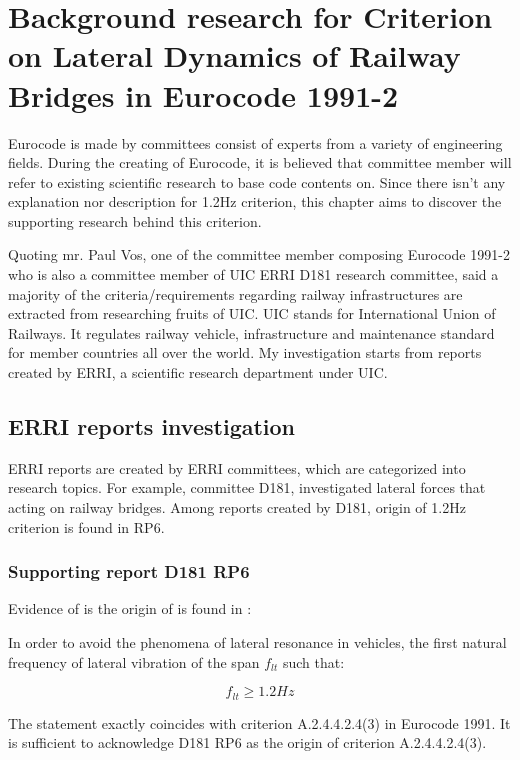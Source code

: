 
\chapter{Background research for Criterion on Lateral Dynamics of Railway Bridges in Eurocode 1991-2}

Eurocode is made by committees consist of experts from a variety of engineering fields. During the creating of Eurocode, it is believed that committee member will refer to existing scientific research to base code contents on. Since there isn't any explanation nor description for 1.2Hz criterion, this chapter aims to discover the supporting research behind this criterion. 

Quoting mr. Paul Vos, one of the committee member composing Eurocode 1991-2 who is also a committee member of UIC ERRI D181 research committee, said a majority of the criteria/requirements regarding railway infrastructures are extracted from researching fruits of UIC. UIC stands for International Union of Railways. It regulates railway vehicle, infrastructure and maintenance standard for member countries all over the world. My investigation starts from reports created by ERRI, a scientific research department under UIC.

\section{ERRI reports investigation}
ERRI reports are created by ERRI committees, which are categorized into research topics. For example, committee D181, investigated lateral forces that acting on railway bridges. Among reports created by D181, origin of 1.2Hz criterion is found in RP6. 

\subsection{Supporting report D181 RP6}
Evidence of \cite{d181} is the origin of \cite[A.2.4.4.2.4(3)]{EC12} is found in \cite[p4.2: Lateral Frequencies]{d181}:

In order to avoid the phenomena of lateral resonance in vehicles, the first natural frequency of lateral vibration of the span $f_{lt}$ such that:

\begin{equation}
f_{lt} \geq 1.2Hz
\end{equation}

The statement exactly coincides with criterion A.2.4.4.2.4(3) in Eurocode 1991. It is sufficient to acknowledge D181 RP6 as the origin of criterion A.2.4.4.2.4(3).

